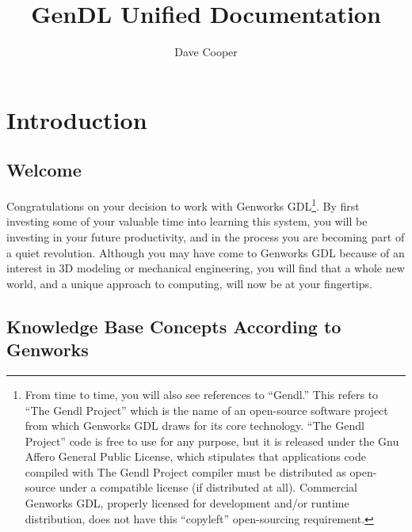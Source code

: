 \documentclass [11pt]{book}
\author {Dave Cooper}
\title {GenDL Unified Documentation}
\begin{document}
\frontmatter



\maketitle



\tableofcontents



\mainmatter



\chapter{Introduction}

\label{chap:introduction}



\section{Welcome}

\label{sec:welcome}

Congratulations on your decision to work with Genworks GDL\footnote{From time to time, you will also see references to
``Gendl.'' This refers to ``The Gendl Project'' which is the name of
an open-source software project from which Genworks GDL draws for its
core technology. ``The Gendl Project'' code is free to use for any
purpose, but it is released under the Gnu Affero General Public
License, which stipulates that applications code compiled with The
Gendl Project compiler must be distributed as open-source under a
compatible license (if distributed at all). Commercial Genworks GDL,
properly licensed for development and/or runtime distribution, does
not have this ``copyleft'' open-sourcing requirement.}. By first investing some of your valuable time into learning
this system, you will be investing in your future productivity, and in
the process you are becoming part of a quiet revolution. Although you
may have come to Genworks GDL because of an interest in 3D modeling or
mechanical engineering, you will find that a whole new world, and a
unique approach to computing, will now be at your fingertips.

\section{Knowledge Base Concepts According to Genworks}
\end{document}
